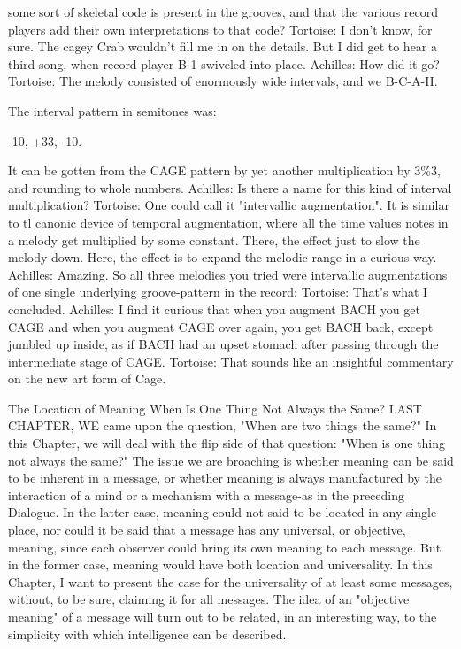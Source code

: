        some sort of skeletal code is present in the grooves, and that the various record players
       add their own interpretations to that code?
Tortoise: I don't know, for sure. The cagey Crab wouldn't fill me in on the details. But I did get
       to hear a third song, when record player B-1 swiveled into place.
Achilles: How did it go?
Tortoise: The melody consisted of enormously wide intervals, and we B-C-A-H.




       The interval pattern in semitones was:

                              -10,    +33,      -10.

       It can be gotten from the CAGE pattern by yet another multiplication by 3\%3, and
       rounding to whole numbers.
Achilles: Is there a name for this kind of interval multiplication?
Tortoise: One could call it "intervallic augmentation". It is similar to tl canonic device of
       temporal augmentation, where all the time values notes in a melody get multiplied by
       some constant. There, the effect just to slow the melody down. Here, the effect is to
       expand the melodic range in a curious way.
Achilles: Amazing. So all three melodies you tried were intervallic augmentations of one single
       underlying groove-pattern in the record:
Tortoise: That's what I concluded.
Achilles: I find it curious that when you augment BACH you get CAGE and when you augment
       CAGE over again, you get BACH back, except jumbled up inside, as if BACH had an
       upset stomach after passing through the intermediate stage of CAGE.
Tortoise: That sounds like an insightful commentary on the new art form of Cage.


                       The Location of Meaning
                   When Is One Thing Not Always the Same?
LAST CHAPTER, WE came upon the question, "When are two things the same?" In this
Chapter, we will deal with the flip side of that question: "When is one thing not always
the same?" The issue we are broaching is whether meaning can be said to be inherent in a
message, or whether meaning is always manufactured by the interaction of a mind or a
mechanism with a message-as in the preceding Dialogue. In the latter case, meaning
could not said to be located in any single place, nor could it be said that a message has
any universal, or objective, meaning, since each observer could bring its own meaning to
each message. But in the former case, meaning would have both location and
universality. In this Chapter, I want to present the case for the universality of at least
some messages, without, to be sure, claiming it for all messages. The idea of an
"objective meaning" of a message will turn out to be related, in an interesting way, to the
simplicity with which intelligence can be described.

